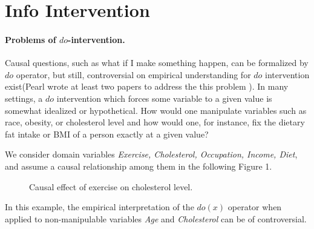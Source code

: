 \section{Info Intervention} 
\label{sec:info}


 




\paragraph{Problems of $do$-intervention.} Causal questions, such as what if I make something happen, can be formalized by $do$ operator, but still, controversial on empirical understanding for $do$ intervention exist(Pearl wrote at least two papers to address the this problem \cite{Pearl2019do, pearl2018does}). In many settings, a $do$ intervention which forces some variable to a given value is somewhat idealized or hypothetical. How would one manipulate variables such as race, obesity, or cholesterol level and how would one, for instance, fix the dietary fat intake or BMI of a person exactly at a given value?

\begin{Eg}
    \label{eg:real}
	We consider domain variables \emph{Exercise, Cholesterol, Occupation, Income, Diet}, and assume a causal relationship among them in the following Figure 1.
    \begin{figure}[ht]
        \label{fig:real}
    	\centering
    	\caption{Causal effect of exercise on cholesterol level.}
    	\label{fig:exercise}
    \end{figure}
\end{Eg}

In this example, the empirical interpretation of the $do(x)$ operator when applied  to non-manipulable variables \emph{Age} and \emph{Cholesterol} can be of controversial. 

